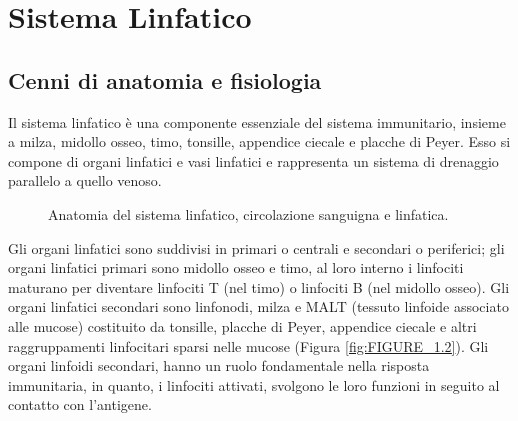 \chapter{Sistema Linfatico}

\section{Cenni di anatomia e fisiologia}
Il sistema linfatico \`e una componente essenziale del sistema immunitario, 
insieme a milza, midollo osseo, timo, tonsille, appendice ciecale e placche di Peyer. 
Esso si compone di organi linfatici e vasi linfatici e rappresenta 
un sistema di drenaggio parallelo a quello venoso\cite{BOOK1}.

\begin{figure}[H]
    \begin{center}
    \vspace{-3mm}
    \end{center}
    \caption{Anatomia del sistema linfatico, circolazione sanguigna e linfatica.
    \cite{img1}}
\end{figure}


Gli organi linfatici sono suddivisi in primari o centrali 
e secondari o periferici; gli organi linfatici primari sono midollo osseo 
e timo, al loro interno i linfociti maturano per diventare linfociti T (nel timo) 
o linfociti B (nel midollo osseo). 
Gli organi linfatici secondari sono linfonodi, milza e MALT 
(tessuto linfoide associato alle mucose) costituito da tonsille, 
placche di Peyer, appendice ciecale e altri raggruppamenti linfocitari 
sparsi nelle mucose (Figura \ref{fig:FIGURE_1.2}). Gli organi linfoidi secondari, hanno un ruolo fondamentale 
nella risposta immunitaria, in quanto, i linfociti attivati, svolgono le loro funzioni 
in seguito al contatto con l'antigene\cite{BOOK1}.

